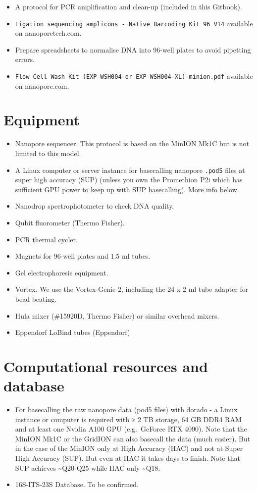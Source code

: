 \documentclass[
]{book}
\providecommand{\tightlist}{%
  \setlength{\itemsep}{0pt}\setlength{\parskip}{0pt}}
\begin{document}
\begin{itemize}
\tightlist
\item
  A protocol for PCR amplification and clean-up (included in this Gitbook).
\item
  \texttt{Ligation\ sequencing\ amplicons\ -\ Native\ Barcoding\ Kit\ 96\ V14} available on nanoporetech.com.
\item
  Prepare spreadsheets to normalise DNA into 96-well plates to avoid pipetting errors.
\item
  \texttt{Flow\ Cell\ Wash\ Kit\ (EXP-WSH004\ or\ EXP-WSH004-XL)-minion.pdf} available on nanopore.com.
\end{itemize}

\section{Equipment}\label{equipment}

\begin{itemize}
\tightlist
\item
  Nanopore sequencer. This protocol is based on the MinION Mk1C but is not limited to this model.
\item
  A Linux computer or server instance for basecalling nanopore \texttt{.pod5} files at super high accuracy (SUP) (unless you own the Promethion P2i which has sufficient GPU power to keep up with SUP basecalling). More info below.
\item
  Nanodrop spectrophotometer to check DNA quality.
\item
  Qubit fluorometer (Thermo Fisher).
\item
  PCR thermal cycler.
\item
  Magnets for 96-well plates and 1.5 ml tubes.
\item
  Gel electrophoresis equipment.
\item
  Vortex. We use the Vortex-Genie 2, including the 24 x 2 ml tube adapter for bead beating.
\item
  Hula mixer (\#15920D, Thermo Fisher) or similar overhead mixers.
\item
  Eppendorf LoBind tubes (Eppendorf)
\end{itemize}

\section{Computational resources and database}\label{computational-resources-and-database}

\begin{itemize}
\item
  For basecalling the raw nanopore data (pod5 files) with dorado - a Linux instance or computer is required with ≥ 2 TB storage, 64 GB DDR4 RAM and at least one Nvidia A100 GPU (e.g.~GeForce RTX 4090). Note that the MinION Mk1C or the GridION can also basecall the data (much easier). But in the case of the MinION only at High Accuracy (HAC) and not at Super High Accuracy (SUP). But even at HAC it takes days to finish. Note that SUP achieves \textasciitilde Q20-Q25 while HAC only \textasciitilde Q18.
\item
  16S-ITS-23S Database. To be confirmed.
\end{itemize}
\end{document}
